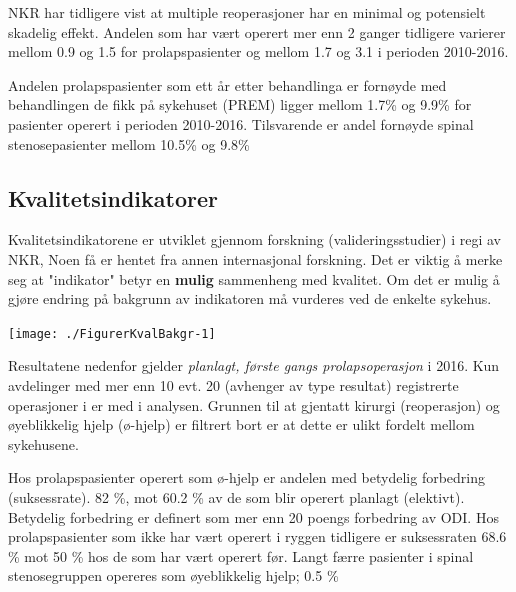 \documentclass [norsk,a4paper,twoside]{article}\usepackage[]{graphicx}\usepackage[]{color}
\newenvironment{knitrout}{}{} %
\begin{document}
NKR har tidligere vist at multiple reoperasjoner har en minimal og potensielt skadelig
effekt. Andelen som har vært operert mer enn 2 ganger tidligere varierer mellom 0.9 
og 1.5 for prolapspasienter og mellom 1.7 
og 3.1 i perioden 2010-2016. 

Andelen prolapspasienter som ett år etter behandlinga er fornøyde med behandlingen de fikk på sykehuset (PREM) ligger mellom 1.7\% og 9.9\% for pasienter operert i perioden 2010-2016. Tilsvarende er andel fornøyde spinal stenosepasienter mellom 10.5\% og 9.8\%

\subsection{Kvalitetsindikatorer}

Kvalitetsindikatorene er  utviklet gjennom forskning (valideringsstudier)  i regi av NKR, Noen få er hentet fra annen internasjonal forskning.  Det er viktig å merke seg at "indikator" betyr en \textbf{mulig} sammenheng med kvalitet. Om det er mulig å gjøre endring på bakgrunn av indikatoren må vurderes ved de enkelte sykehus.


\begin{knitrout}
\color{fgcolor}

{\centering \texttt{[image: ./FigurerKvalBakgr-1]} 

}



\end{knitrout}

Resultatene nedenfor gjelder  \textit{planlagt, første gangs prolapsoperasjon} i 2016. 
Kun avdelinger med mer enn 10 evt. 20 (avhenger av type resultat) registrerte operasjoner i er med i
analysen. Grunnen til at gjentatt kirurgi (reoperasjon) og øyeblikkelig hjelp (ø-hjelp)
er filtrert bort er at dette er ulikt fordelt mellom sykehusene.


Hos prolapspasienter operert som ø-hjelp er andelen med betydelig forbedring (suksessrate).  82 \%, mot 60.2 \% av de som blir operert planlagt (elektivt). Betydelig forbedring er definert som mer enn 20 poengs forbedring av ODI.
Hos prolapspasienter som ikke har vært operert i ryggen tidligere er suksessraten 68.6 \% mot 50 \%
hos de som har vært operert før. 
Langt færre pasienter i spinal stenosegruppen opereres som øyeblikkelig hjelp; 0.5 \%
\end{document}

